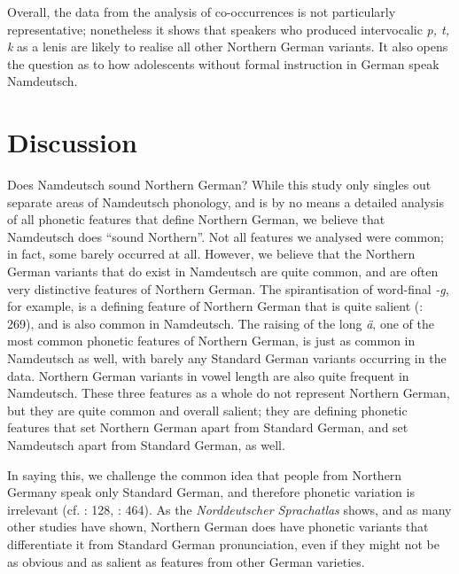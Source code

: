 \documentclass[output=paper]{langsci/langscibook}
\begin{document}
Overall, the data from the analysis of co-occurrences is not particularly representative; nonetheless it shows that speakers who produced intervocalic \textit{p, t, k} as a lenis are likely to realise all other Northern German variants. It also opens the question as to how adolescents without formal instruction in German speak Namdeutsch.

\section{Discussion}
\label{sec:stuhl:5}

Does Namdeutsch sound Northern German? While this study only singles out separate areas of Namdeutsch phonology, and is by no means a detailed analysis of all phonetic features that define Northern German, we believe that Namdeutsch does “sound Northern”. Not all features we analysed were common; in fact, some barely occurred at all. However, we believe that the Northern German variants that do exist in Namdeutsch are quite common, and are often very distinctive features of Northern German. The spirantisation of word-final \textit{-g}, for example, is a defining feature of Northern German that is quite salient (\citealt{elmentaler_norddeutscher_2015}: 269), and is also common in Namdeutsch. The raising of the long \textit{ä}, one of the most common phonetic features of Northern German, is just as common in Namdeutsch as well, with barely any Standard German variants occurring in the data. Northern German variants in vowel length are also quite frequent in Namdeutsch. These three features as a whole do not represent Northern German, but they are quite common and overall salient; they are defining phonetic features that set Northern German apart from Standard German, and set Namdeutsch apart from Standard German, as well. 

In saying this, we challenge the common idea that people from Northern Germany speak only Standard German, and therefore phonetic variation is irrelevant (cf. \citealt{nockler_sprachmischung_1963}: 128, \citealt{putz_sudwesterdeutsch_1991}: 464). As the \textit{Norddeutscher Sprachatlas} shows, and as many other studies have shown, Northern German does have phonetic variants that differentiate it from Standard German pronunciation, even if they might not be as obvious and as salient as features from other German varieties. 
\end{document}
